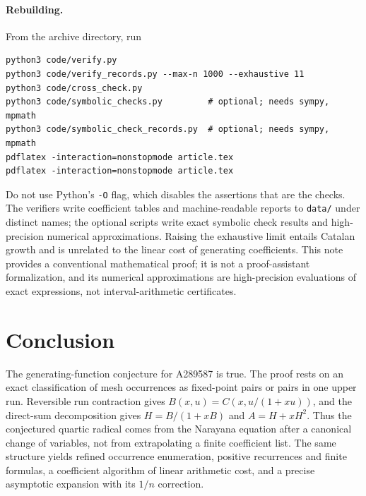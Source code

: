 \documentclass[11pt,letterpaper]{article}
\numberwithin{equation}{section}
\theoremstyle{definition}
\begin{document}
\paragraph{Rebuilding.}
From the archive directory, run
\begin{verbatim}
python3 code/verify.py
python3 code/verify_records.py --max-n 1000 --exhaustive 11
python3 code/cross_check.py
python3 code/symbolic_checks.py         # optional; needs sympy, mpmath
python3 code/symbolic_check_records.py  # optional; needs sympy, mpmath
pdflatex -interaction=nonstopmode article.tex
pdflatex -interaction=nonstopmode article.tex
\end{verbatim}
Do not use Python's \texttt{-O} flag, which disables the assertions that
are the checks. The verifiers write coefficient tables and
machine-readable reports to \texttt{data/} under distinct names; the
optional scripts write exact symbolic check results and high-precision
numerical approximations. Raising the exhaustive limit entails Catalan
growth and is unrelated to the linear cost of generating coefficients.
This note provides a conventional mathematical proof; it is not a
proof-assistant formalization, and its numerical approximations are
high-precision evaluations of exact expressions, not
interval-arithmetic certificates.

\section{Conclusion}

The generating-function conjecture for A289587 is true. The proof rests
on an exact classification of mesh occurrences as fixed-point pairs
or pairs in one upper run. Reversible run contraction gives
$B(x,u)=C(x,u/(1+xu))$, and the direct-sum decomposition gives
$H=B/(1+xB)$ and $A=H+xH^2$. Thus the conjectured quartic radical
comes from the Narayana equation after a canonical change of variables,
not from extrapolating a finite coefficient list. The same structure
yields refined occurrence enumeration, positive recurrences and finite
formulas, a coefficient algorithm of linear arithmetic cost, and a
precise asymptotic expansion with its $1/n$ correction.
\end{document}
